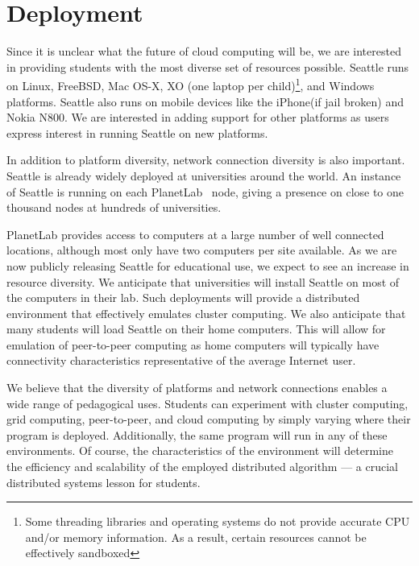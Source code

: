 \section{Deployment}
\label{sec-deployment}

Since it is unclear what the future of cloud computing will be, we are
interested in providing students with the most diverse set of
resources possible. Seattle runs on Linux, FreeBSD, Mac OS-X, XO (one
laptop per child)\footnote[1]{Some threading libraries and operating
  systems do not provide accurate CPU and/or memory information. As a
  result, certain resources cannot be effectively sandboxed}, and
Windows platforms. Seattle also runs on mobile devices like the
iPhone\footnotemark[1] (if jail broken) and Nokia N800\footnotemark[1].
We are interested in adding support for other platforms as users
express interest in running Seattle on new platforms.

In addition to platform diversity, network connection diversity is
also important. Seattle is already widely deployed at universities
around the world. An instance of Seattle is running on each 
PlanetLab~\cite{PlanetLab} node, giving a presence on close to one thousand
nodes at hundreds of universities.  

PlanetLab provides access to computers at a large number of well
connected locations, although most only have two computers per site
available. As we are now publicly releasing Seattle for educational
use, we expect to see an increase in resource diversity.  We
anticipate that universities will install Seattle on most of the
computers in their lab. Such deployments will provide a distributed
environment that effectively emulates cluster computing. We also
anticipate that many students will load Seattle on their home
computers. This will allow for emulation of peer-to-peer computing as
home computers will typically have connectivity characteristics
representative of the average Internet user.

We believe that the diversity of platforms and network connections
enables a wide range of pedagogical uses. Students can experiment with
cluster computing, grid computing, peer-to-peer, and cloud computing
by simply varying where their program is deployed. Additionally, the
same program will run in any of these environments. Of course, the
characteristics of the environment will determine the efficiency and
scalability of the employed distributed algorithm --- a crucial
distributed systems lesson for students.

